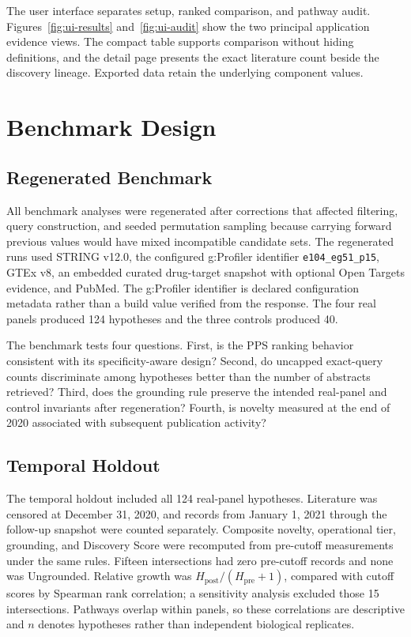 \documentclass{ieeeaccess}
\newcommand{\code}[1]{{\fontseries{m}\selectfont\texttt{#1}}}
\begin{document}
The user interface separates setup, ranked comparison, and pathway audit. Figures~\ref{fig:ui-results} and~\ref{fig:ui-audit} show the two principal application evidence views. The compact table supports comparison without hiding definitions, and the detail page presents the exact literature count beside the discovery lineage. Exported data retain the underlying component values.

\section{Benchmark Design}
\label{sec:benchmark}

\subsection{Regenerated Benchmark}
All benchmark analyses were regenerated after corrections that affected filtering, query construction, and seeded permutation sampling because carrying forward previous values would have mixed incompatible candidate sets. The regenerated runs used STRING v12.0, the configured g:Profiler identifier \code{e104\_eg51\_p15}, GTEx v8, an embedded curated drug-target snapshot with optional Open Targets evidence, and PubMed. The g:Profiler identifier is declared configuration metadata rather than a build value verified from the response. The four real panels produced 124 hypotheses and the three controls produced 40.

The benchmark tests four questions. First, is the PPS ranking behavior consistent with its specificity-aware design? Second, do uncapped exact-query counts discriminate among hypotheses better than the number of abstracts retrieved? Third, does the grounding rule preserve the intended real-panel and control invariants after regeneration? Fourth, is novelty measured at the end of 2020 associated with subsequent publication activity?

\subsection{Temporal Holdout}
The temporal holdout included all 124 real-panel hypotheses. Literature was censored at December 31, 2020, and records from January 1, 2021 through the follow-up snapshot were counted separately. Composite novelty, operational tier, grounding, and Discovery Score were recomputed from pre-cutoff measurements under the same rules. Fifteen intersections had zero pre-cutoff records and none was Ungrounded. Relative growth was $H_{\mathrm{post}}/(H_{\mathrm{pre}}+1)$, compared with cutoff scores by Spearman rank correlation; a sensitivity analysis excluded those 15 intersections. Pathways overlap within panels, so these correlations are descriptive and $n$ denotes hypotheses rather than independent biological replicates.
\end{document}
